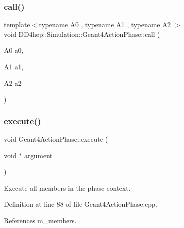 \hypertarget{class_d_d4hep_1_1_simulation_1_1_geant4_action_phase_a4b3a668313dcbc74b3c739ffa832ce33}{}\label{class_d_d4hep_1_1_simulation_1_1_geant4_action_phase_a4b3a668313dcbc74b3c739ffa832ce33} 
\subsubsection{\texorpdfstring{call()}{call()}\hspace{0.1cm}{\footnotesize\ttfamily [12/12]}}
{\footnotesize\ttfamily template$<$typename A0 , typename A1 , typename A2 $>$ \\
void D\+D4hep\+::\+Simulation\+::\+Geant4\+Action\+Phase\+::call (\begin{DoxyParamCaption}\item[{A0}]{a0,  }\item[{A1}]{a1,  }\item[{A2}]{a2 }\end{DoxyParamCaption})}

\hypertarget{class_d_d4hep_1_1_simulation_1_1_geant4_action_phase_a69f90116c5b2b689cf25e88e0a9f90e7}{}\label{class_d_d4hep_1_1_simulation_1_1_geant4_action_phase_a69f90116c5b2b689cf25e88e0a9f90e7} 
\subsubsection{\texorpdfstring{execute()}{execute()}}
{\footnotesize\ttfamily void Geant4\+Action\+Phase\+::execute (\begin{DoxyParamCaption}\item[{void $\ast$}]{argument }\end{DoxyParamCaption})}



Execute all members in the phase context. 



Definition at line 88 of file Geant4\+Action\+Phase.\+cpp.



References m\+\_\+members.



